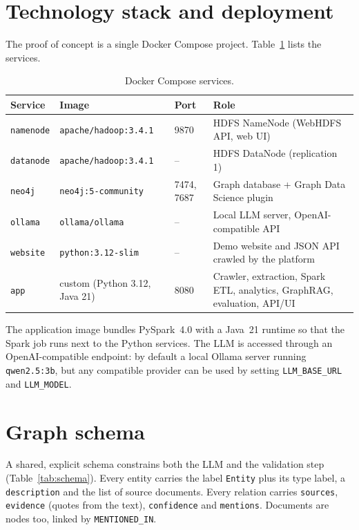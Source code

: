 \documentclass[11pt,a4paper]{report}
\begin{document}
\section{Technology stack and deployment}
The proof of concept is a single Docker Compose project. Table~\ref{tab:services} lists the services.

\begin{table}[ht]
\centering
\small
\begin{tabularx}{\linewidth}{lllX}
\toprule
\textbf{Service} & \textbf{Image} & \textbf{Port} & \textbf{Role} \\
\midrule
\texttt{namenode} & \texttt{apache/hadoop:3.4.1} & 9870 & HDFS NameNode (WebHDFS API, web UI) \\
\texttt{datanode} & \texttt{apache/hadoop:3.4.1} & -- & HDFS DataNode (replication 1) \\
\texttt{neo4j} & \texttt{neo4j:5-community} & 7474, 7687 & Graph database + Graph Data Science plugin \\
\texttt{ollama} & \texttt{ollama/ollama} & -- & Local LLM server, OpenAI-compatible API \\
\texttt{website} & \texttt{python:3.12-slim} & -- & Demo website and JSON API crawled by the platform \\
\texttt{app} & custom (Python 3.12, Java 21) & 8080 & Crawler, extraction, Spark ETL, analytics, GraphRAG, evaluation, API/UI \\
\bottomrule
\end{tabularx}
\caption{Docker Compose services.}
\label{tab:services}
\end{table}

The application image bundles PySpark~4.0 with a Java~21 runtime so that the Spark job runs next to the
Python services. The LLM is accessed through an OpenAI-compatible endpoint: by default a local Ollama server running
\texttt{qwen2.5:3b}, but any compatible provider can be used by setting \texttt{LLM\_BASE\_URL} and
\texttt{LLM\_MODEL}.

\section{Graph schema}
A shared, explicit schema constrains both the LLM and the validation step (Table~\ref{tab:schema}). Every entity
carries the label \texttt{Entity} plus its type label, a \texttt{description} and the list of source documents.
Every relation carries \texttt{sources}, \texttt{evidence} (quotes from the text), \texttt{confidence} and
\texttt{mentions}. Documents are nodes too, linked by \texttt{MENTIONED\_IN}.
\end{document}
